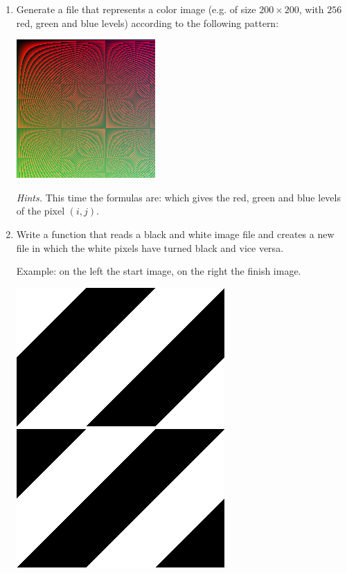 \documentclass[11pt,class=report,crop=false]{standalone}
\begin{document}
\begin{activite}
\begin{enumerate}
   \item Generate a file  that represents a color image (e.g. of size $200 \times 200$, with $256$ red, green and blue levels) according to the following pattern:
\begin{center}
\includegraphics[scale=\myscale,scale=0.7]{screen-image_coul}
\end{center}   

\emph{Hints.} This time the formulas are:
which gives the red, green and blue levels of the pixel $(i,j)$.

\item Write a function  that reads a black and white image file  and creates a new file in which the white pixels have turned black and vice versa. 

Example: on the left the start image, on the right the finish image.
\begin{center}
\includegraphics[scale=\myscale,scale=0.3]{screen-simple_nb}\qquad\qquad
\includegraphics[scale=\myscale,scale=0.3]{screen-simple_nb_inverse}
\end{center} 


\end{enumerate}
\end{activite}
\end{document}
